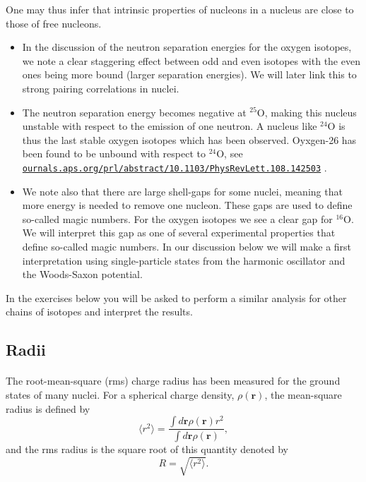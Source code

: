 \documentclass[%
twoside,                 %
final,                   %
10pt]{article}
\begin{document}
\noindent
One may thus infer that intrinsic properties of nucleons in a nucleus are close to those of free nucleons.
\begin{itemize}
\item In the discussion of the neutron separation energies for the oxygen isotopes, we note  a clear staggering effect between odd and even isotopes with the even ones being more bound (larger separation energies). We will later link this to strong pairing correlations in nuclei.

\item The neutron separation energy becomes negative at ${}^{25}\mbox{O}$, making this nucleus unstable with respect to the emission of one neutron. A nucleus like ${}^{24}\mbox{O}$ is thus the last stable oxygen isotopes which has been observed. Oyxgen-26 has been found to be unbound with respect to ${}^{24}\mbox{O}$, see \href{{ournals.aps.org/prl/abstract/10.1103/PhysRevLett.108.142503}}{\nolinkurl{ournals.aps.org/prl/abstract/10.1103/PhysRevLett.108.142503}} .

\item We note also that there are large shell-gaps for some nuclei, meaning that more energy is needed to remove one nucleon. These gaps are used to define so-called magic numbers. For the oxygen isotopes we see a clear gap for ${}^{16}\mbox{O}$. We will interpret this gap as one of several experimental properties that define so-called magic numbers. In our discussion below we will make a first interpretation using  single-particle states from the harmonic oscillator and the Woods-Saxon potential. 
\end{itemize}

\noindent
In the exercises below you will be asked to perform a similar analysis for other chains of isotopes and interpret the results.

 


\subsection*{Radii}

\paragraph{}
The root-mean-square (rms) charge radius has been measured for the ground states of many
nuclei. For a spherical charge density, $\rho(\bm{r})$, the mean-square radius is defined by
\[
\langle r^2\rangle = \frac{ \int  d \bm{r} \rho(\bm{r}) r^2}{ \int  d \bm{r} \rho(\bm{r})},
\]
and the rms radius is the square root of this quantity denoted by
\[
R =\sqrt{ \langle r^2\rangle}.
\]
\end{document}
